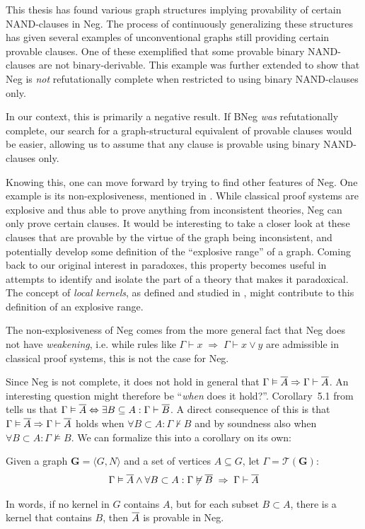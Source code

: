 This thesis has found various graph structures implying provability of certain NAND-clauses in Neg.
The process of continuously generalizing these structures has given several examples of unconventional graphs still providing certain provable clauses.
One of these exemplified that some provable binary NAND-clauses are not binary-derivable.
This example was further extended to show that Neg is \textit{not} refutationally complete when restricted to using binary NAND-clauses only.

In our context, this is primarily a negative result.
If BNeg \textit{was} refutationally complete, our search for a graph-structural equivalent of provable clauses would be easier, allowing us to assume that any clause is provable using binary NAND-clauses only.

Knowing this, one can move forward by trying to find other features of Neg.
One example is its non-explosiveness, mentioned in \cite{michal-completeness}.
While classical proof systems are explosive and thus able to prove anything from inconsistent theories, Neg can only prove certain clauses.
It would be interesting to take a closer look at these clauses that are provable by the virtue of the graph being inconsistent, and potentially develop some definition of the ``explosive range'' of a graph.
Coming back to our original interest in paradoxes, this property becomes useful in attempts to identify and isolate the part of a theory that makes it paradoxical.
The concept of \textit{local kernels}, as defined and studied in \cite{synthese-pdl}, might contribute to this definition of an explosive range.

The non-explosiveness of Neg comes from the more general fact that Neg does not have \textit{weakening}, i.e. while rules like $\Gamma \vdash x \; \Rightarrow \; \Gamma \vdash x \vee y$ are admissible in classical proof systems, this is not the case for Neg.

Since Neg is not complete, it does not hold in general that $\Gamma \vDash \ol{A} \Rightarrow \Gamma \vdash \ol{A}$.
An interesting question might therefore be ``\textit{when} does it hold?''.
Corollary~5.1 from \cite{michal-completeness} tells us that $\Gamma \vDash \ol{A} \Leftrightarrow \exists B \subseteq A: \Gamma \vdash \ol{B}$.
A direct consequence of this is that $\Gamma \vDash \ol{A} \Rightarrow \Gamma \vdash \ol{A}$ holds when $\forall B \subset A: \Gamma \not\vdash B$ and by soundness also when $\forall B \subset A: \Gamma \not\vDash B$.
We can formalize this into a corollary on its own:
\begin{corollary}
  Given a graph $\mathbf{G} = \langle G,N \rangle$ and a set of vertices $A \subseteq G$, let $\Gamma = \mathcal{T}(\mathbf{G})$:
  \begin{align}
    \Gamma \vDash \ol{A} \wedge \forall B \subset A: \Gamma \not\vDash \ol{ B } \;\Rightarrow \; \Gamma \vdash \ol{A}
  \end{align}
\end{corollary}
In words, if no kernel in $G$ contains $A$, but for each subset $B \subset A$, there is a kernel that contains $B$, then $\ol{A}$ is provable in Neg.

